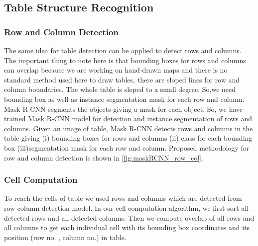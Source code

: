 \subsection{Table Structure Recognition}
\label{sec:methodology_structure}
\subsubsection{Row and Column Detection}
\label{sec:methodology_structure_rowCol}
The same idea for table detection can be applied to detect rows and columns. The important thing to note here is that bounding boxes for rows and columns can overlap because we are working on hand-drawn maps and there is no standard method used here to draw tables, there are sloped lines for row and column boundaries.
The whole table is sloped to a small degree. So,we need bounding box as well as instance segmentation mask for each row and  column.
Mask R-CNN segments the objects giving a mask for each object. So, we have trained Mask R-CNN model for detection and instance segmentation of rows and columns. Given an image of table, Mask R-CNN detects rows and columns in the table giving (i) bounding boxes for rows and columns (ii) class for each bounding box (iii)segmentation mask for each row and column. Proposed methodology for row and column detection is shown in \autoref{fig:maskRCNN_row_col}.
\subsubsection{Cell Computation}
\label{sec:methodology_structure_cell}
To reach the cells of table we used rows and columns which are detected from row column detection model. In our cell computation algorithm, we first sort all detected rows and all detected columns. Then we compute overlap of all rows and all columns to get each individual cell with its bounding box coordinates and its position (row no. , column no.) in table.
